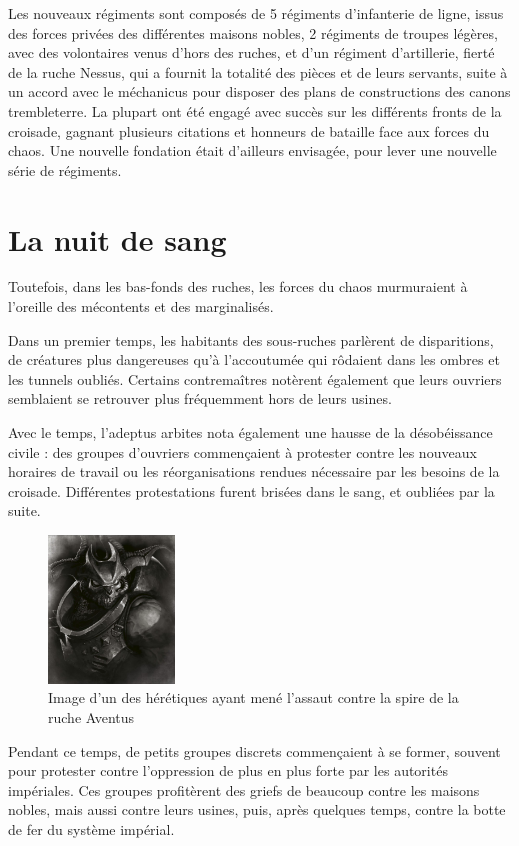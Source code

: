 \documentclass[10pt,a4paper]{book}
\begin{document}
Les nouveaux régiments sont composés de 5 régiments d'infanterie de ligne, issus des forces privées des différentes maisons nobles, 2 régiments de troupes légères, avec des volontaires venus d'hors des ruches, et d'un régiment d'artillerie, fierté de la ruche Nessus, qui a fournit la totalité des pièces et de leurs servants, suite à un accord avec le méchanicus pour disposer des plans de constructions des canons trembleterre. La plupart ont été engagé avec succès sur les différents fronts de la croisade, gagnant plusieurs citations et honneurs de bataille face aux forces du chaos. Une nouvelle fondation était d'ailleurs envisagée, pour lever une nouvelle série de régiments.
\section{La nuit de sang}
Toutefois, dans les bas-fonds des ruches, les forces du chaos murmuraient à l'oreille des mécontents et des marginalisés. 

Dans un premier temps, les habitants des sous-ruches parlèrent de disparitions, de créatures plus dangereuses qu'à l'accoutumée qui rôdaient dans les ombres et les tunnels oubliés. Certains contremaîtres notèrent également que leurs ouvriers semblaient se retrouver plus fréquemment hors de leurs usines.

Avec le temps, l'adeptus arbites nota également une hausse de la désobéissance civile : des groupes d'ouvriers commençaient à protester contre les nouveaux horaires de travail ou les réorganisations rendues nécessaire par les besoins de la croisade. Différentes protestations furent brisées dans le sang, et oubliées par la suite.

\begin{figure}
  \centering
  \includegraphics[width = 0.3\textwidth]{chaos 1.png}
  \caption{Image d'un des hérétiques ayant mené l'assaut contre la spire de la ruche Aventus}
\end{figure}

Pendant ce temps, de petits groupes discrets commençaient à se former, souvent pour protester contre l'oppression de plus en plus forte par les autorités impériales. Ces groupes profitèrent des griefs de beaucoup contre les maisons nobles, mais aussi contre leurs usines, puis, après quelques temps, contre la botte de fer du système impérial.
\end{document}
